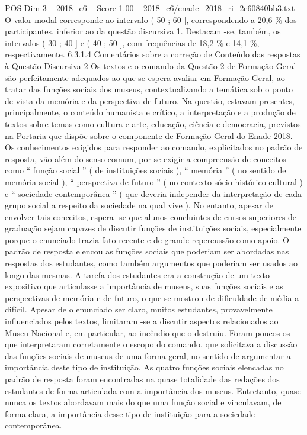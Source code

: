 \begin{textsample}{POS Dim 3 – 2018\_c6 – Score 1.00 – 2018\_c6/enade\_2018\_ri\_2e60840bb3.txt}
O valor modal corresponde ao intervalo ( 50 ; 60 ], correspondendo a 20,6 \% dos participantes, inferior ao da questão discursiva 1.
Destacam -se, também, os intervalos ( 30 ; 40 ] e ( 40 ; 50 ], com frequências de 18,2 \% e 14,1 \%, respectivamente. 6.3.1.4 Comentários sobre a correção de Conteúdo das respostas à Questão Discursiva 2 Os textos e o comando da Questão 2 de Formação Geral são perfeitamente adequados ao que se espera avaliar em Formação Geral, ao tratar das funções sociais dos museus, contextualizando a temática sob o ponto de vista da memória e da perspectiva de futuro.
Na questão, estavam presentes, principalmente, o conteúdo humanista e crítico, a interpretação e a produção de textos sobre temas como cultura e arte, educação, ciência e democracia, previstos na Portaria que dispõe sobre o componente de Formação Geral do Enade 2018.
Os conhecimentos exigidos para responder ao comando, explicitados no padrão de resposta, vão além do senso comum, por se exigir a compreensão de conceitos como “ função social ” ( de instituições sociais ), “ memória ” ( no sentido de memória social ), “ perspectiva de futuro ” ( no contexto sócio-histórico-cultural ) e “ sociedade contemporânea ” ( que deveria independer da interpretação de cada grupo social a respeito da sociedade na qual vive ).
No entanto, apesar de envolver tais conceitos, espera -se que alunos concluintes de cursos superiores de graduação sejam capazes de discutir funções de instituições sociais, especialmente porque o enunciado trazia fato recente e de grande repercussão como apoio.
O padrão de resposta elencou as funções sociais que poderiam ser abordadas nas respostas dos estudantes, como também argumentos que poderiam ser usados ao longo das mesmas.
A tarefa dos estudantes era a construção de um texto expositivo que articulasse a importância de museus, suas funções sociais e as perspectivas de memória e de futuro, o que se mostrou de dificuldade de média a difícil.
Apesar de o enunciado ser claro, muitos estudantes, provavelmente influenciados pelos textos, limitaram -se a discutir aspectos relacionados ao Museu Nacional e, em particular, ao incêndio que o destruiu.
Foram poucos os que interpretaram corretamente o escopo do comando, que solicitava a discussão das funções sociais de museus de uma forma geral, no sentido de argumentar a importância deste tipo de instituição.
As quatro funções sociais elencadas no padrão de resposta foram encontradas na quase totalidade das redações dos estudantes de forma articulada com a importância dos museus.
Entretanto, quase nunca os textos abordavam mais do que uma função social e vinculavam, de forma clara, a importância desse tipo de instituição para a sociedade contemporânea.

\end{textsample}
